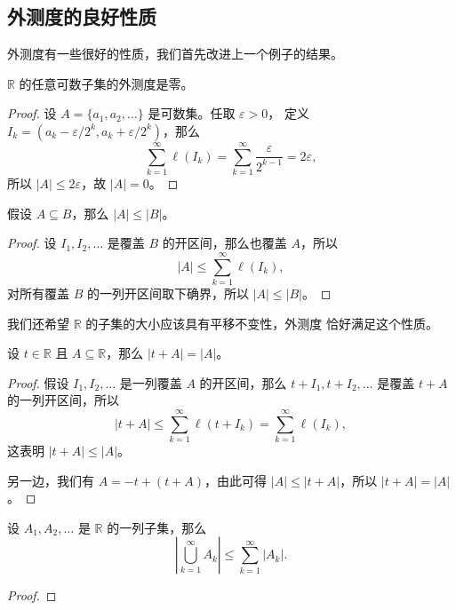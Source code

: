 \documentclass[fontset=none]{Notes}
\begin{document}
\subsection{外测度的良好性质}

外测度有一些很好的性质，我们首先改进上一个例子的结果。

\begin{proposition}[可数集的外测度为零]
  $\mathbb{R}$ 的任意可数子集的外测度是零。
\end{proposition}
\begin{proof}
  设 $A=\{a_1,a_2,\dots\}$ 是可数集。任取 $\varepsilon>0$，
  定义 $I_k=(a_k-\varepsilon/2^k,a_k+\varepsilon/2^k)$，那么
  \[
    \sum_{k=1}^\infty \ell(I_k)=\sum_{k=1}^\infty\frac{\varepsilon}{2^{k-1}}
    =2\varepsilon,
  \]
  所以 $|A|\leq 2\varepsilon$，故 $|A|=0$。
\end{proof}

\begin{proposition}[外测度保序]
  假设 $A\subseteq B$，那么 $|A|\leq|B|$。
\end{proposition}
\begin{proof}
  设 $I_1,I_2,\dots$ 是覆盖 $B$ 的开区间，那么也覆盖 $A$，所以
  \[
    |A|\leq\sum_{k=1}^\infty\ell(I_k),
  \]
  对所有覆盖 $B$ 的一列开区间取下确界，所以 $|A|\leq|B|$。
\end{proof}

我们还希望 $\mathbb{R}$ 的子集的大小应该具有平移不变性，外测度
恰好满足这个性质。

\begin{proposition}[外测度具有平移不变性]
  设 $t\in \mathbb{R}$ 且 $A\subseteq \mathbb{R}$，那么 
  $|t+A|=|A|$。
\end{proposition}
\begin{proof}
  假设 $I_1,I_2,\dots$ 是一列覆盖 $A$ 的开区间，那么 $t+I_1,t+I_2,\dots$
  是覆盖 $t+A$ 的一列开区间，所以
  \[
    |t+A|\leq \sum_{k=1}^\infty\ell(t+I_k)=\sum_{k=1}^\infty \ell(I_k),
  \]
  这表明 $|t+A|\leq |A|$。

  另一边，我们有 $A=-t+(t+A)$，由此可得 $|A|\leq |t+A|$，所以
  $|t+A|=|A|$。
\end{proof}

\begin{proposition}[外测度的次可加性]
  设 $A_1,A_2,\dots$ 是 $\mathbb{R}$ 的一列子集，那么
  \[
    \left|\bigcup_{k=1}^\infty A_k\right|\leq\sum_{k=1}^\infty|A_k|.
  \]
\end{proposition}
\begin{proof}
  
\end{proof}
\end{document}
